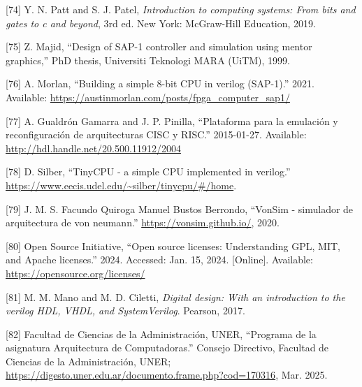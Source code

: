 \documentclass[12pt,oneside]{templates/unerthesis}
\newcommand{\CSLLeftMargin}[1]{#1} %
\newcommand{\CSLRightInline}[1]{#1} %
\newlength{\cslhangindent}
\newenvironment{CSLReferences}[2] %
 {\setlength{\parindent}{0pt}%
  \setlength{\leftskip}{#1 pt\relax}%
  \setlength{\parskip}{#2 pt\relax}%
  \everypar{\setlength{\hangindent}{\cslhangindent}}}
 {\par}
\begin{document}
\begin{CSLReferences}{0}{0}
\leavevmode{}%
\CSLLeftMargin{{[}74{]} }%
\CSLRightInline{Y. N. Patt and S. J. Patel, \emph{Introduction to computing systems: From bits and gates to c and beyond}, 3rd ed. New York: McGraw-Hill Education, 2019.}

\leavevmode{}%
\CSLLeftMargin{{[}75{]} }%
\CSLRightInline{Z. Majid, {``Design of SAP-1 controller and simulation using mentor graphics,''} PhD thesis, Universiti Teknologi MARA (UiTM), 1999.}

\leavevmode{}%
\CSLLeftMargin{{[}76{]} }%
\CSLRightInline{A. Morlan, {``Building a simple 8-bit CPU in verilog (SAP-1).''} 2021. Available: \url{https://austinmorlan.com/posts/fpga_computer_sap1/}}

\leavevmode{}%
\CSLLeftMargin{{[}77{]} }%
\CSLRightInline{A. Gualdrón Gamarra and J. P. Pinilla, {``Plataforma para la emulación y reconfiguración de arquitecturas CISC y RISC.''} 2015-01-27. Available: \url{http://hdl.handle.net/20.500.11912/2004}}

\leavevmode{}%
\CSLLeftMargin{{[}78{]} }%
\CSLRightInline{D. Silber, {``TinyCPU - a simple CPU implemented in verilog.''} \url{https://www.eecis.udel.edu/~silber/tinycpu/\#/home}.}

\leavevmode{}%
\CSLLeftMargin{{[}79{]} }%
\CSLRightInline{J. M. S. Facundo Quiroga Manuel Bustos Berrondo, {``VonSim - simulador de arquitectura de von neumann.''} \url{https://vonsim.github.io/}, 2020.}

\leavevmode{}%
\CSLLeftMargin{{[}80{]} }%
\CSLRightInline{Open Source Initiative, {``Open source licenses: Understanding {GPL}, {MIT}, and {Apache} licenses.''} 2024. Accessed: Jan. 15, 2024. {[}Online{]}. Available: \url{https://opensource.org/licenses/}}

\leavevmode{}%
\CSLLeftMargin{{[}81{]} }%
\CSLRightInline{M. M. Mano and M. D. Ciletti, \emph{Digital design: With an introduction to the verilog HDL, VHDL, and SystemVerilog}. Pearson, 2017.}

\leavevmode{}%
\CSLLeftMargin{{[}82{]} }%
\CSLRightInline{Facultad de Ciencias de la Administración, UNER, {``{Programa de la asignatura Arquitectura de Computadoras}.''} Consejo Directivo, Facultad de Ciencias de la Administración, UNER; \url{https://digesto.uner.edu.ar/documento.frame.php?cod=170316}, Mar. 2025.}

\end{CSLReferences}
\end{document}

